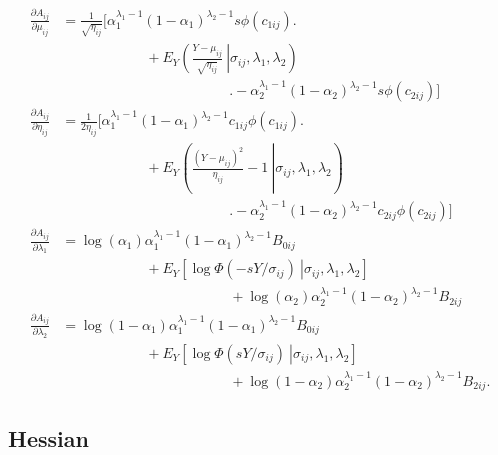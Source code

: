 \documentclass[
  american,
  man, donotrepeattitle,floatsintext]{apa7}
\begin{document}
\begin{align}
\frac{\partial A_{ij}}{\partial \mu_{ij}} &= \frac{1}{\sqrt{\eta_{ij}}} \biggl[ \alpha_1^{\lambda_1 - 1} (1 - \alpha_1)^{\lambda_2 - 1} s \phi(c_{1ij}) \biggr. \nonumber \\
& \qquad \qquad \qquad + E_Y\left(\left.\frac{Y - \mu_{ij}}{\sqrt{\eta_{ij}}} \ \right| \sigma_{ij}, \lambda_1,\lambda_2\right)  \nonumber \\
& \qquad \qquad \qquad \qquad \qquad \qquad \biggl. - \alpha_2^{\lambda_1 - 1} (1 - \alpha_2)^{\lambda_2 - 1} s \phi(c_{2ij}) \biggr] \\
\frac{\partial A_{ij}}{\partial \eta_{ij}} &= \frac{1}{2\eta_{ij}} \biggl[\alpha_1^{\lambda_1 - 1} (1 - \alpha_1)^{\lambda_2 - 1} c_{1ij} \phi(c_{1ij}) \biggr. \nonumber \\
& \qquad \qquad \qquad + E_Y\left(\left. \frac{(Y - \mu_{ij})^2}{\eta_{ij}} - 1 \ \right| \sigma_{ij}, \lambda_1,\lambda_2\right)  \nonumber \\
& \qquad \qquad \qquad \qquad \qquad \qquad \biggl. - \alpha_2^{\lambda_1 - 1} (1 - \alpha_2)^{\lambda_2 - 1} c_{2ij} \phi(c_{2ij}) \biggr] \\
\frac{\partial A_{ij}}{\partial \lambda_1} &= \log(\alpha_1) \alpha_1^{\lambda_1 - 1} (1 - \alpha_1)^{\lambda_2 - 1} B_{0ij} \nonumber \\
& \qquad \qquad \qquad + E_Y\left[\left.\log \Phi(-s Y / \sigma_{ij}) \ \right| \sigma_{ij}, \lambda_1,\lambda_2\right] \nonumber \\
& \qquad \qquad \qquad \qquad \qquad \qquad + \log(\alpha_2) \alpha_2^{\lambda_1 - 1} (1 - \alpha_2)^{\lambda_2 - 1} B_{2ij} \\
\frac{\partial A_{ij}}{\partial \lambda_2} &= \log(1 - \alpha_1) \alpha_1^{\lambda_1 - 1} (1 - \alpha_1)^{\lambda_2 - 1} B_{0ij} \nonumber \\
& \qquad \qquad \qquad + E_Y\left[\left.\log \Phi(sY / \sigma_{ij}) \ \right| \sigma_{ij}, \lambda_1,\lambda_2\right] \nonumber \\
& \qquad \qquad \qquad \qquad \qquad \qquad + \log(1 - \alpha_2) \alpha_2^{\lambda_1 - 1} (1 - \alpha_2)^{\lambda_2 - 1} B_{2ij}.
\end{align}

\subsection{Hessian}\label{hessian}
\end{document}
